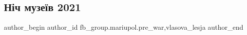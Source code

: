  
 
 
 
 

\subsection{Ніч музеїв 2021}
\label{sec:14_01_2023.fb.fb_group.mariupol.pre_war.2.n_ch_muze_v_2021}
 
\ifcmt
 author_begin
   author_id fb_group.mariupol.pre_war,vlasova_lesja
 author_end
\fi
